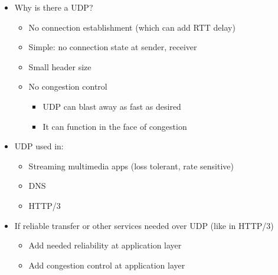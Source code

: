 \begin{itemize}
\begin{itemize}
\begin{itemize}
        \end{itemize}

      \item Why is there a UDP?

        \begin{itemize}

          \item No connection establishment (which can add RTT delay)

          \item Simple: no connection state at sender, receiver

          \item Small header size

          \item No congestion control

            \begin{itemize}

              \item UDP can blast away as fast as desired

              \item It can function in the face of congestion

            \end{itemize}

        \end{itemize}

      \item UDP used in:

        \begin{itemize}

          \item Streaming multimedia apps (loss tolerant, rate sensitive)

          \item DNS

          \item HTTP/3

        \end{itemize}

      \item If reliable transfer or other services needed over UDP (like in HTTP/3)

        \begin{itemize}

          \item Add needed reliability at application layer

          \item Add congestion control at application layer


\end{itemize}
\end{itemize}
\end{itemize}
